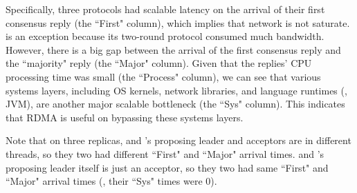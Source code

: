 Specifically, three protocols had scalable latency on the arrival of their 
first consensus reply (the ``First" column), which implies that network is not 
saturate. \libpaxos is an exception because its two-round protocol consumed 
much bandwidth. However, there is a big gap between the arrival of the first 
consensus reply and the ``majority" reply (the ``Major" column). Given that the 
replies' CPU processing time was small (the ``Process" column), we can see that 
various systems layers, including OS kernels, network libraries, and 
language runtimes (\eg, JVM), are another major scalable bottleneck (the ``Sys" 
column). This indicates that RDMA is useful on bypassing these systems layers.

Note that on three replicas, \libpaxos and \crane's proposing 
leader and acceptors are in different threads, so they two had different 
``First" and ``Major" arrival times. \crane and \spaxos's proposing 
leader itself is just an acceptor, so they two had same ``First" and ``Major" 
arrival times (\ie, their ``Sys" times were 0).


% 

